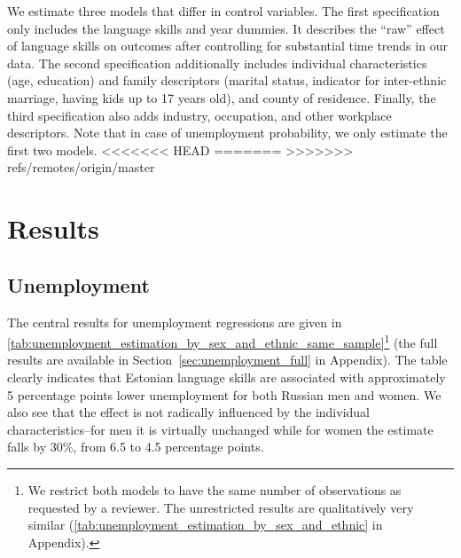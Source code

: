 \documentclass[12pt, a4paper]{article}
\begin{document}
We estimate three models that differ in
control variables. The first specification only includes the language skills
and year dummies.  It describes the ``raw'' effect of language skills
on outcomes after controlling for substantial time trends in our data.
The second specification additionally includes individual
characteristics (age, education) and family descriptors (marital
status, indicator for inter-ethnic marriage, having kids up to 17 years
old), and county of residence.  
Finally, the third specification also adds industry, occupation, and other
workplace descriptors.
Note that in case of unemployment probability,
we only estimate the first two models.
<<<<<<< HEAD
=======
>>>>>>> refs/remotes/origin/master


\section{Results}
\label{sec:results}
\subsection{Unemployment}
\label{subsec:basic_model_unemployment}

The central results for unemployment regressions are given in
\cref{tab:unemployment_estimation_by_sex_and_ethnic_same_sample}\footnote{We
  restrict both models to have the same number of observations as
  requested by a reviewer. The unrestricted results are qualitatively
  very similar (\cref{tab:unemployment_estimation_by_sex_and_ethnic}
  in Appendix).}
(the full results are available in Section~\ref{sec:unemployment_full}
in Appendix).
The
table clearly indicates that Estonian language skills are associated
with approximately 5 percentage points lower unemployment for both
Russian men and women. We also see that the effect is not radically
influenced by the individual characteristics--for men it is
virtually unchanged while for women the estimate falls by 30\%, from
6.5 to 4.5 percentage points.
\end{document}
